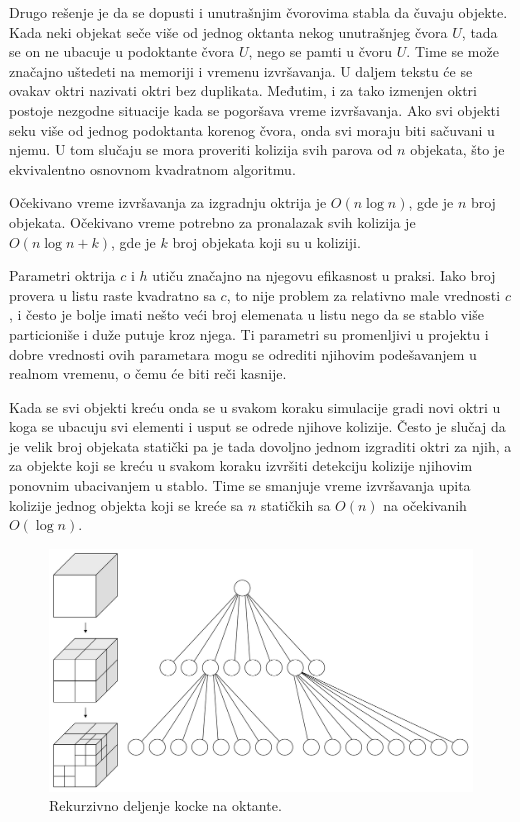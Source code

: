 \documentclass[12pt,oneside]{memoir}
\begin{document}
Drugo rešenje je da se dopusti i unutrašnjim čvorovima stabla da čuvaju objekte.
Kada neki objekat seče više od jednog oktanta nekog unutrašnjeg čvora $U$, tada se on ne ubacuje 
u podoktante čvora $U$, nego se pamti u čvoru $U$. Time se može značajno uštedeti na memoriji i vremenu izvršavanja.
U daljem tekstu će se ovakav oktri nazivati oktri bez duplikata.
Međutim, i za tako izmenjen oktri postoje nezgodne situacije kada se pogoršava vreme izvršavanja.
Ako svi objekti seku više od jednog podoktanta korenog čvora, onda svi moraju biti sačuvani u njemu. 
U tom slučaju se mora proveriti kolizija svih parova od $n$ objekata, što je ekvivalentno osnovnom kvadratnom algoritmu.

Očekivano vreme izvršavanja za izgradnju oktrija je $O(n \log n)$, gde je $n$ broj objekata.
Očekivano vreme potrebno za pronalazak svih kolizija je $O(n \log n + k)$, gde je $k$ broj objekata koji su u koliziji.

Parametri oktrija $c$ i $h$  utiču značajno na njegovu efikasnost u praksi. 
Iako broj provera u listu raste kvadratno sa $c$, to nije problem za relativno male vrednosti $c$, i često je bolje 
imati nešto veći broj elemenata u listu nego da se stablo više particioniše i duže putuje kroz njega.
Ti parametri su promenljivi u projektu i dobre vrednosti ovih parametara mogu se odrediti njihovim podešavanjem u realnom vremenu,
o čemu će biti reči kasnije.

Kada se svi objekti kreću onda se u svakom koraku simulacije  gradi novi oktri u
koga se ubacuju svi elementi i usput se odrede njihove kolizije.
Često je slučaj da je velik broj objekata statički pa je tada dovoljno jednom izgraditi oktri za njih, a za objekte koji se kreću u svakom koraku 
izvršiti detekciju kolizije njihovim ponovnim ubacivanjem u stablo. Time se smanjuje vreme izvršavanja upita 
kolizije jednog objekta koji se kreće sa $n$ statičkih sa $O(n)$ na očekivanih $O(\log n)$.

\begin{figure}[h!]
	\begin{center}
	\includegraphics[scale=0.22]{octree.png}
	\end{center}
	\caption{Rekurzivno deljenje kocke na oktante.}
	\label{fig:oct}
\end{figure}
\end{document}
